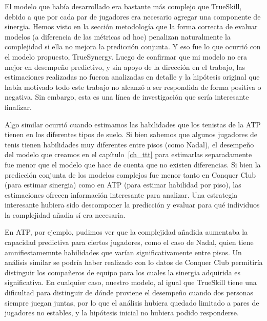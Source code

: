 \documentclass[a4paper,11pt]{book}
\theoremstyle{definition}
\begin{document}

El modelo que hab\'ia desarrollado era bastante m\'as complejo que TrueSkill, debido a que por cada par de jugadores era necesario agregar una componente de sinergia.
%
Hemos visto en la secci\'on metodolog\'ia que la forma correcta de evaluar modelos (a diferencia de las m\'etricas ad hoc) penalizan naturalmente la complejidad si ella no mejora la predicci\'on conjunta.
%
Y eso fue lo que ocurri\'o con el modelo propuesto, TrueSynergy.
%
Luego de confirmar que mi modelo no era mejor en desempe\~no predictivo, y sin apoyo de la direcci\'on en el trabajo, las estimaciones realizadas no fueron analizadas en detalle y la hip\'otesis original que hab\'ia motivado todo este trabajo no alcanz\'o a ser respondida de forma positiva o negativa.
%
Sin embargo, esta es una l\'inea de investigaci\'on que ser\'ia interesante finalizar.


Algo similar ocurri\'o cuando estimamos las habilidades que los tenistas de la ATP tienen en los diferentes tipos de suelo.
%
Si bien sabemos que algunos jugadores de tenis tienen habilidades muy diferentes entre pisos (como Nadal), el desempe\~no del modelo que creamos en el cap\'itulo~\ref{ch_ttt} para estimarlas separadamente fue menor que el modelo que hace de cuenta que no existen diferencias.
%
Si bien la predicci\'on conjunta de los modelos complejos fue menor tanto en Conquer Club (para estimar sinergia) como en ATP (para estimar habilidad por piso), las estimaciones ofrecen informaci\'on interesante para analizar.
%
Una estrategia interesante hubiera sido descomponer la predicci\'on y evaluar para qu\'e individuos la complejidad a\~nadia s\'i era necesaria.


En ATP, por ejemplo, pudimos ver que la complejidad a\~nadida aumentaba la capacidad predictiva para ciertos jugadores, como el caso de Nadal, quien tiene amnifiestamemnte habilidades que var\'ian significativamente entre pisos.
%
Un an\'alisis similar se podr\'ia haber realizado con lo datos de Conquer Club permitir\'ia distinguir los compa\~neros de equipo para los cuales la sinergia adquirida es significativa.
%
En cualquier caso, nuestro modelo, al igual que TrueSkill tiene una dificultad para distinguir de d\'onde proviene el desempe\~no cuando dos personas siempre juegan juntas, por lo que el an\'alisis hubiera quedado limitado a pares de jugadores no estables, y la hip\'otesis inicial no hubiera podido responderse.
\end{document}
